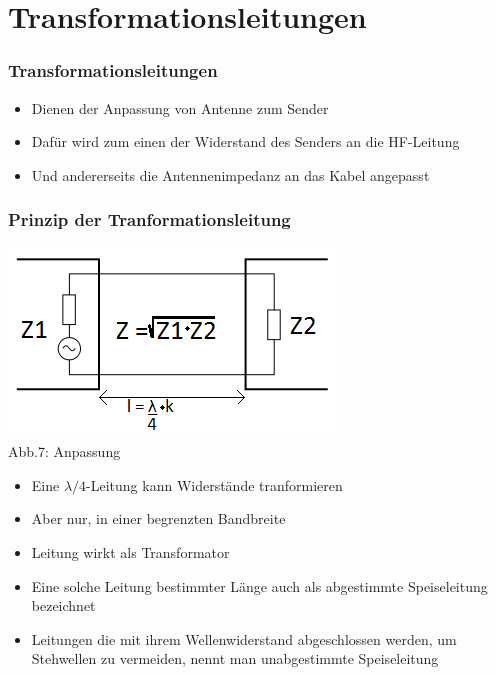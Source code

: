 \section*{Transformationsleitungen}
\begin{frame}
\frametitle{Transformationsleitungen}
\begin{itemize}
	\item	Dienen der Anpassung von Antenne zum Sender
	\item	Dafür wird zum einen der Widerstand des Senders an die HF-Leitung
	\item	Und andererseits die Antennenimpedanz an das Kabel angepasst
\end{itemize}
\end{frame}

\begin{frame}
\frametitle{Prinzip der Tranformationsleitung}
	\includegraphics[scale=0.5]{a10/Anpassung.png}\\
	Abb.7: Anpassung \cite{wp}
	\begin{itemize}
		\item	Eine $\lambda /4$-Leitung kann Widerstände tranformieren
		\item	Aber nur, in einer begrenzten Bandbreite
		\item	Leitung wirkt als Transformator
		\item	Eine solche Leitung bestimmter Länge auch als abgestimmte Speiseleitung bezeichnet
		\item	Leitungen die mit ihrem Wellenwiderstand abgeschlossen werden, um Stehwellen zu vermeiden, nennt man unabgestimmte Speiseleitung
	\end{itemize}
\end{frame}

